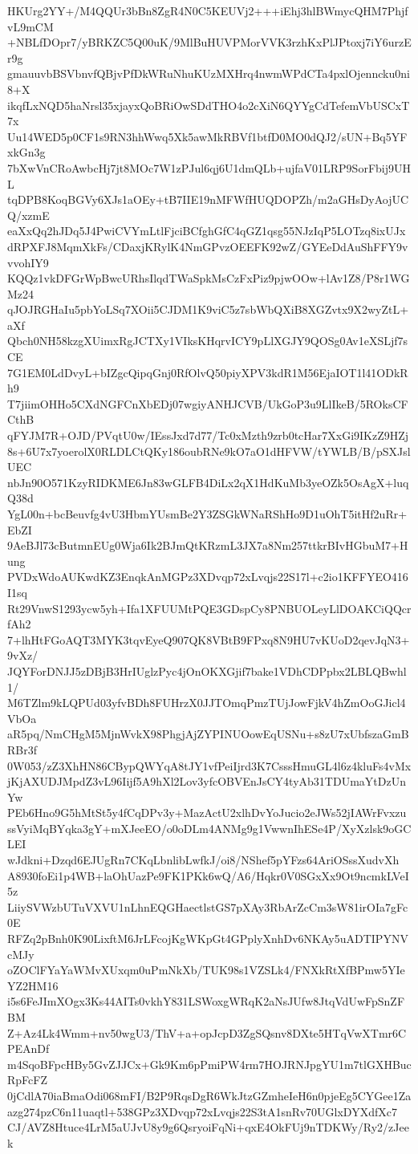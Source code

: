 HKUrg2YY+/M4QQUr3bBn8ZgR4N0C5KEUVj2+++iEhj3hlBWmycQHM7PhjfvL9mCM
+NBLfDOpr7/yBRKZC5Q00uK/9MlBuHUVPMorVVK3rzhKxPlJPtoxj7iY6urzEr9g
gmauuvbBSVbnvfQBjvPfDkWRuNhuKUzMXHrq4nwmWPdCTa4pxlOjenncku0ni8+X
ikqfLxNQD5haNrsl35xjayxQoBRiOwSDdTHO4o2cXiN6QYYgCdTefemVbUSCxT7x
Uu14WED5p0CF1s9RN3hhWwq5Xk5awMkRBVf1btfD0MO0dQJ2/sUN+Bq5YFxkGn3g
7bXwVnCRoAwbcHj7jt8MOc7W1zPJul6qj6U1dmQLb+ujfaV01LRP9SorFbij9UHL
tqDPB8KoqBGVy6XJs1aOEy+tB7IIE19nMFWfHUQDOPZh/m2aGHsDyAojUCQ/xzmE
eaXxQq2hJDq5J4PwiCVYmLtlFjciBCfghGfC4qGZ1qsg55NJzIqP5LOTzq8ixUJx
dRPXFJ8MqmXkFs/CDaxjKRylK4NmGPvzOEEFK92wZ/GYEeDdAuShFFY9vvvohIY9
KQQz1vkDFGrWpBwcURhsIlqdTWaSpkMsCzFxPiz9pjwOOw+lAv1Z8/P8r1WGMz24
qJOJRGHaIu5pbYoLSq7XOii5CJDM1K9viC5z7sbWbQXiB8XGZvtx9X2wyZtL+aXf
Qbch0NH58kzgXUimxRgJCTXy1VIksKHqrvICY9pLlXGJY9QOSg0Av1eXSLjf7sCE
7G1EM0LdDvyL+bIZgcQipqGnj0RfOlvQ50piyXPV3kdR1M56EjaIOT1l41ODkRh9
T7jiimOHHo5CXdNGFCnXbEDj07wgiyANHJCVB/UkGoP3u9LlIkeB/5ROksCFCthB
qFYJM7R+OJD/PVqtU0w/IEssJxd7d77/Tc0xMzth9zrb0tcHar7XxGi9IKzZ9HZj
8s+6U7x7yoerolX0RLDLCtQKy186oubRNe9kO7aO1dHFVW/tYWLB/B/pSXJslUEC
nbJn90O571KzyRIDKME6Jn83wGLFB4DiLx2qX1HdKuMb3yeOZk5OsAgX+luqQ38d
YgL00n+bcBeuvfg4vU3HbmYUsmBe2Y3ZSGkWNaRShHo9D1uOhT5itHf2uRr+EbZI
9AeBJl73cButmnEUg0Wja6Ik2BJmQtKRzmL3JX7a8Nm257ttkrBIvHGbuM7+Hung
PVDxWdoAUKwdKZ3EnqkAnMGPz3XDvqp72xLvqjs22S17l+c2io1KFFYEO416I1sq
Rt29VnwS1293ycw5yh+Ifa1XFUUMtPQE3GDspCy8PNBUOLeyLlDOAKCiQQcrfAh2
7+lhHtFGoAQT3MYK3tqvEyeQ907QK8VBtB9FPxq8N9HU7vKUoD2qevJqN3+9vXz/
JQYForDNJJ5zDBjB3HrIUglzPyc4jOnOKXGjif7bake1VDhCDPpbx2LBLQBwhl1/
M6TZlm9kLQPUd03yfvBDh8FUHrzX0JJTOmqPmzTUjJowFjkV4hZmOoGJicl4VbOa
aR5pq/NmCHgM5MjnWvkX98PhgjAjZYPINUOowEqUSNu+s8zU7xUbfszaGmBRBr3f
0W053/zZ3XhHN86CBypQWYqA8tJY1vfPeiIjrd3K7CsssHmuGL4l6z4kluFs4vMx
jKjAXUDJMpdZ3vL96Iijf5A9hXl2Lov3yfcOBVEnJsCY4tyAb31TDUmaYtDzUnYw
PEb6Hno9G5hMtSt5y4fCqDPv3y+MazActU2xlhDvYoJucio2eJWs52jIAWrFvxzu
ssVyiMqBYqka3gY+mXJeeEO/o0oDLm4ANMg9g1VwwnIhESe4P/XyXzlsk9oGCLEI
wJdkni+Dzqd6EJUgRn7CKqLbnlibLwfkJ/oi8/NShef5pYFzs64AriOSssXudvXh
A8930foEi1p4WB+laOhUazPe9FK1PKk6wQ/A6/Hqkr0V0SGxXx9Ot9ncmkLVeI5z
LiiySVWzbUTuVXVU1nLhnEQGHaectlstGS7pXAy3RbArZcCm3sW81irOIa7gFc0E
RFZq2pBnh0K90LixftM6JrLFcojKgWKpGt4GPplyXnhDv6NKAy5uADTIPYNVcMJy
oZOClFYaYaWMvXUxqm0uPmNkXb/TUK98s1VZSLk4/FNXkRtXfBPmw5YIeYZ2HM16
i5s6FeJImXOgx3Ks44AITs0vkhY831LSWoxgWRqK2aNsJUfw8JtqVdUwFpSnZFBM
Z+Az4Lk4Wmm+nv50wgU3/ThV+a+opJcpD3ZgSQsnv8DXte5HTqVwXTmr6CPEAnDf
m4SqoBFpcHBy5GvZJJCx+Gk9Km6pPmiPW4rm7HOJRNJpgYU1m7tlGXHBucRpFcFZ
0jCdlA70iaBmaOdi068mFI/B2P9RqsDgR6WkJtzGZmheIeH6n0pjeEg5CYGee1Za
azg274pzC6n11uaqtl+538GPz3XDvqp72xLvqjs22S3tA1snRv70UGlxDYXdfXc7
CJ/AVZ8Htuce4LrM5aUJvU8y9g6QsryoiFqNi+qxE4OkFUj9nTDKWy/Ry2/zJeek
